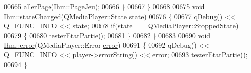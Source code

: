 \begin{DoxyCode}
00665         \hyperlink{class_ihm_a52bf0bd258d00a16d3e1037a9288948b}{allerPage}(\hyperlink{class_ihm_a472c7a7bec7e6e0230842f78ace4833eadc27359267c694f4d9c3afc23fe8b82f}{Ihm::PageJeu});
00666     \}
00667 \}
00668 
\hyperlink{class_ihm_a3c815827527ca8f9c586e001e8e95721}{00675} \textcolor{keywordtype}{void} \hyperlink{class_ihm_a3c815827527ca8f9c586e001e8e95721}{Ihm::stateChanged}(QMediaPlayer::State state)
00676 \{
00677     qDebug() << Q\_FUNC\_INFO << state;
00678     \textcolor{keywordflow}{if}(state == QMediaPlayer::StoppedState)
00679     \{
00680         \hyperlink{class_ihm_a8dbd08db43f7c80ca7266cc6b162f571}{testerEtatPartie}();
00681     \}
00682 \}
00683 
\hyperlink{class_ihm_a28b5dd043c4d752bb944110d8d8457aa}{00690} \textcolor{keywordtype}{void} \hyperlink{class_ihm_a28b5dd043c4d752bb944110d8d8457aa}{Ihm::error}(QMediaPlayer::Error \hyperlink{class_ihm_a28b5dd043c4d752bb944110d8d8457aa}{error})
00691 \{
00692     qDebug() << Q\_FUNC\_INFO << \hyperlink{class_ihm_a633230fb15d587e647ad9d2d6142ebc3}{player}->errorString() << \hyperlink{class_ihm_a28b5dd043c4d752bb944110d8d8457aa}{error};
00693     \hyperlink{class_ihm_a8dbd08db43f7c80ca7266cc6b162f571}{testerEtatPartie}();
00694 \}
\end{DoxyCode}
